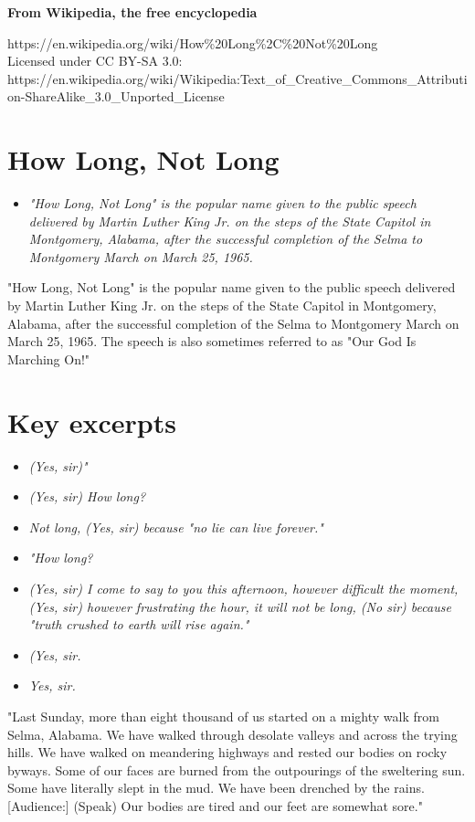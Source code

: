 \textbf{From Wikipedia, the free encyclopedia}

https://en.wikipedia.org/wiki/How\%20Long\%2C\%20Not\%20Long\\
Licensed under CC BY-SA 3.0:\\
https://en.wikipedia.org/wiki/Wikipedia:Text\_of\_Creative\_Commons\_Attribution-ShareAlike\_3.0\_Unported\_License

\section{How Long, Not Long}\label{how-long-not-long}

\begin{itemize}
\item
  \emph{"How Long, Not Long" is the popular name given to the public
  speech delivered by Martin Luther King Jr. on the steps of the State
  Capitol in Montgomery, Alabama, after the successful completion of the
  Selma to Montgomery March on March 25, 1965.}
\end{itemize}

"How Long, Not Long" is the popular name given to the public speech
delivered by Martin Luther King Jr. on the steps of the State Capitol in
Montgomery, Alabama, after the successful completion of the Selma to
Montgomery March on March 25, 1965. The speech is also sometimes
referred to as "Our God Is Marching On!"

\section{Key excerpts}\label{key-excerpts}

\begin{itemize}
\item
  \emph{(Yes, sir)"}
\item
  \emph{(Yes, sir) How long?}
\item
  \emph{Not long, (Yes, sir) because "no lie can live forever."}
\item
  \emph{"How long?}
\item
  \emph{(Yes, sir) I come to say to you this afternoon, however
  difficult the moment, (Yes, sir) however frustrating the hour, it will
  not be long, (No sir) because "truth crushed to earth will rise
  again."}
\item
  \emph{(Yes, sir.}
\item
  \emph{Yes, sir.}
\end{itemize}

"Last Sunday, more than eight thousand of us started on a mighty walk
from Selma, Alabama. We have walked through desolate valleys and across
the trying hills. We have walked on meandering highways and rested our
bodies on rocky byways. Some of our faces are burned from the
outpourings of the sweltering sun. Some have literally slept in the mud.
We have been drenched by the rains. {[}Audience:{]} (Speak) Our bodies
are tired and our feet are somewhat sore."

